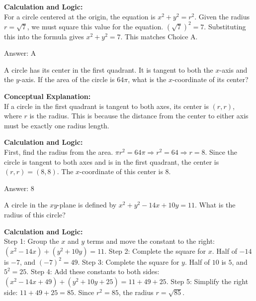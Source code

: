 \documentclass[11pt,paper=a4,answers]{exam}
\begin{document}
\begin{questions}
\begin{solution}
\textbf{Calculation and Logic:} \\
For a circle centered at the origin, the equation is $x^2 + y^2 = r^2$. Given the radius $r = \sqrt{7}$, we must square this value for the equation. $(\sqrt{7})^2 = 7$. Substituting this into the formula gives $x^2 + y^2 = 7$. This matches Choice A.

\vspace{30pt}

Answer: \colorbox{yellow!100}{A}
\end{solution}

\vspace{60pt}

\question
A circle has its center in the first quadrant. It is tangent to both the $x$-axis and the $y$-axis. If the area of the circle is $64\pi$, what is the $x$-coordinate of its center?

\begin{solution}
\textbf{Conceptual Explanation:} \\
If a circle in the first quadrant is tangent to both axes, its center is $(r, r)$, where $r$ is the radius. This is because the distance from the center to either axis must be exactly one radius length.

\vspace{30pt}

\textbf{Calculation and Logic:} \\
First, find the radius from the area. $\pi r^2 = 64\pi \Rightarrow r^2 = 64 \Rightarrow r = 8$. Since the circle is tangent to both axes and is in the first quadrant, the center is $(r, r) = (8, 8)$. The $x$-coordinate of this center is 8.

\vspace{30pt}

Answer: \colorbox{yellow!100}{8}
\end{solution}

\vspace{60pt}

\question
A circle in the $xy$-plane is defined by $x^2 + y^2 - 14x + 10y = 11$. What is the radius of this circle?

\begin{solution}
\textbf{Calculation and Logic:} \\
Step 1: Group the $x$ and $y$ terms and move the constant to the right: $(x^2 - 14x) + (y^2 + 10y) = 11$. Step 2: Complete the square for $x$. Half of $-14$ is $-7$, and $(-7)^2 = 49$. Step 3: Complete the square for $y$. Half of $10$ is $5$, and $5^2 = 25$. Step 4: Add these constants to both sides: $(x^2 - 14x + 49) + (y^2 + 10y + 25) = 11 + 49 + 25$. Step 5: Simplify the right side: $11 + 49 + 25 = 85$. Since $r^2 = 85$, the radius $r = \sqrt{85}$.


\end{solution}
\end{questions}
\end{document}
